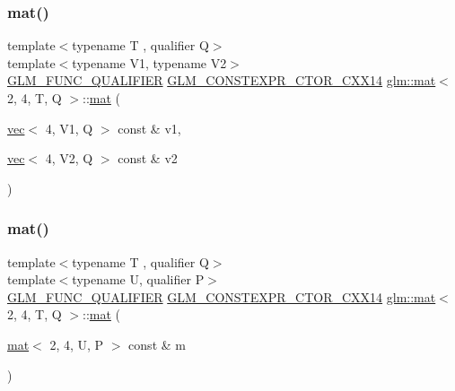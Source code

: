 \subsubsection{\texorpdfstring{mat()}{mat()}\hspace{0.1cm}{\footnotesize\ttfamily [20/21]}}
{\footnotesize\ttfamily template$<$typename T , qualifier Q$>$ \\
template$<$typename V1, typename V2$>$ \\
\hyperlink{setup_8hpp_a33fdea6f91c5f834105f7415e2a64407}{G\+L\+M\+\_\+\+F\+U\+N\+C\+\_\+\+Q\+U\+A\+L\+I\+F\+I\+ER} \hyperlink{setup_8hpp_a0900f9145e68bf6061b6f5e7be3fa751}{G\+L\+M\+\_\+\+C\+O\+N\+S\+T\+E\+X\+P\+R\+\_\+\+C\+T\+O\+R\+\_\+\+C\+X\+X14} \hyperlink{structglm_1_1mat}{glm\+::mat}$<$ 2, 4, T, Q $>$\+::\hyperlink{structglm_1_1mat}{mat} (\begin{DoxyParamCaption}\item[{\hyperlink{structglm_1_1vec}{vec}$<$ 4, V1, Q $>$ const \&}]{v1,  }\item[{\hyperlink{structglm_1_1vec}{vec}$<$ 4, V2, Q $>$ const \&}]{v2 }\end{DoxyParamCaption})}

\mbox{\label{structglm_1_1mat_3_012_00_014_00_01_t_00_01_q_01_4_a0fba6a2c0edf428cb93057e2eca9f7ad}} 
\subsubsection{\texorpdfstring{mat()}{mat()}\hspace{0.1cm}{\footnotesize\ttfamily [21/21]}}
{\footnotesize\ttfamily template$<$typename T , qualifier Q$>$ \\
template$<$typename U, qualifier P$>$ \\
\hyperlink{setup_8hpp_a33fdea6f91c5f834105f7415e2a64407}{G\+L\+M\+\_\+\+F\+U\+N\+C\+\_\+\+Q\+U\+A\+L\+I\+F\+I\+ER} \hyperlink{setup_8hpp_a0900f9145e68bf6061b6f5e7be3fa751}{G\+L\+M\+\_\+\+C\+O\+N\+S\+T\+E\+X\+P\+R\+\_\+\+C\+T\+O\+R\+\_\+\+C\+X\+X14} \hyperlink{structglm_1_1mat}{glm\+::mat}$<$ 2, 4, T, Q $>$\+::\hyperlink{structglm_1_1mat}{mat} (\begin{DoxyParamCaption}\item[{\hyperlink{structglm_1_1mat}{mat}$<$ 2, 4, U, P $>$ const \&}]{m }\end{DoxyParamCaption})}



